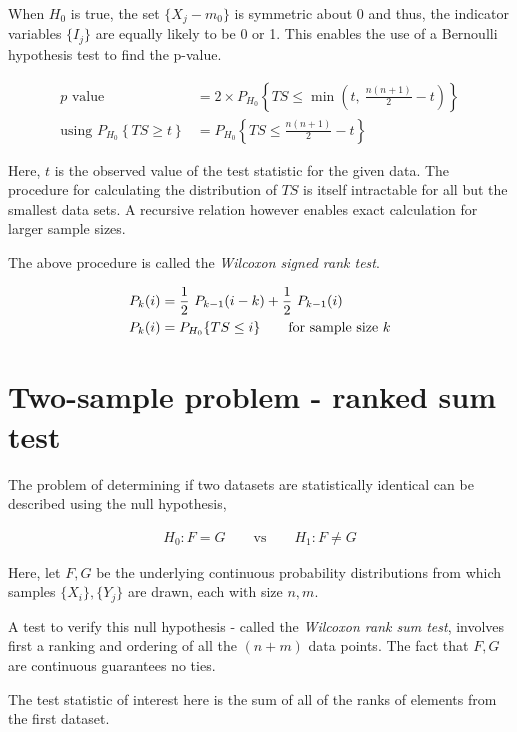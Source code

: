 When $ H_0 $ is true, the set $ \{X_j - m_0\} $ is symmetric about 0 and thus, the indicator variables $ \{I_j\} $ are equally likely to be 0 or 1. This enables the use of a Bernoulli hypothesis test to find the p-value.

\begin{align}
	p \text{ value} &= 2 \times P_{H_0} \left\{TS \leq \min\left(t,\ \frac{n(n+1)}{2} - t\right)\right\} \\
	\text{using } P_{H_0} \left\{TS \geq t\right\} &= P_{H_0} \left\{TS \leq \frac{n(n+1)}{2} - t\right\}
\end{align}

Here, $ t $ is the observed value of the test statistic for the given data. The procedure for calculating the distribution of $ TS $ is itself intractable for all but the smallest data sets. A recursive relation however enables exact calculation for larger sample sizes.

The above procedure is called the \textit{Wilcoxon signed rank test}.

\begin{align}
	P_k (i) &= \frac{1}{2}\ P_{k-1} (i-k) + \frac{1}{2}\ P_{k-1} (i) \\
	P_k (i) &= P_{H_0} \{TS \leq i\} \qquad \text{for sample size $ k $}
\end{align}

\section{Two-sample problem - ranked sum test}

The problem of determining if two datasets are statistically identical can be described using the null hypothesis,

\begin{align}
	H_0 : F = G \qquad \text{vs} \qquad H_1 : F \neq G
\end{align}

Here, let $ F, G $ be the underlying continuous probability distributions from which samples $ \{X_i\}, \{Y_j\} $ are drawn, each with size $ n, m $.

A test to verify this null hypothesis - called the \textit{Wilcoxon rank sum test}, involves first a ranking and ordering of all the $ (n+m) $ data points. The fact that $ F, G $ are continuous guarantees no ties.

The test statistic of interest here is the sum of all of the ranks of elements from the first dataset.


